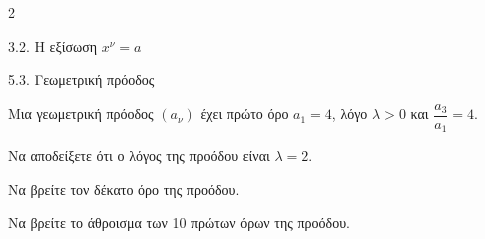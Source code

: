 \begin{ylh}{2}
    \item 3.2. Η εξίσωση $x^{\nu}=a$
    \item 5.3. Γεωμετρική πρόοδος
\end{ylh}
Μια γεωμετρική πρόοδος $(a_\nu)$ έχει πρώτο όρο $a_1 = 4$, λόγο $\lambda > 0$ και $\dfrac{a_3}{a_1} = 4$.

\begin{alist}
\item Να αποδείξετε ότι ο λόγος της προόδου είναι $\lambda = 2$. 
\item Να βρείτε τον δέκατο όρο της προόδου. 
\item Να βρείτε το άθροισμα των 10 πρώτων όρων της προόδου. 
\end{alist}

